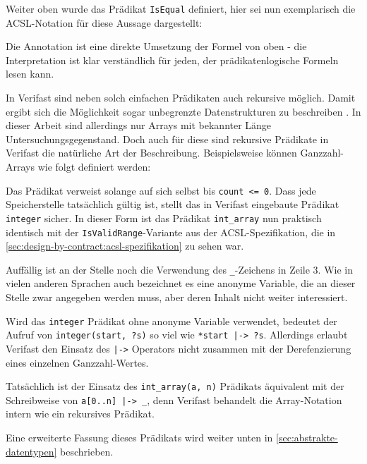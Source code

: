 Weiter oben wurde das Prädikat \lstinline{IsEqual} definiert, hier sei nun exemplarisch die ACSL-Notation
für diese Aussage dargestellt:



Die Annotation ist eine direkte Umsetzung der Formel von oben - die Interpretation ist klar verständlich für 
jeden, der prädikatenlogische Formeln lesen kann.

In Verifast sind neben solch einfachen Prädikaten auch rekursive möglich. Damit ergibt sich die Möglichkeit
sogar unbegrenzte Datenstrukturen zu beschreiben . In dieser
Arbeit sind allerdings nur Arrays mit bekannter Länge Untersuchungsgegenstand. Doch auch für diese sind
rekursive Prädikate in Verifast die natürliche Art der Beschreibung. Beispielsweise können Ganzzahl-Arrays
wie folgt definiert werden:


 
Das Prädikat verweist solange auf sich selbst bis \lstinline{count <= 0}. Dass jede Speicherstelle tatsächlich
gültig ist, stellt das in Verifast eingebaute Prädikat \lstinline{integer} sicher. In dieser Form ist das Prädikat
\lstinline{int_array} nun praktisch identisch mit der \lstinline{IsValidRange}-Variante aus der ACSL-Spezifikation, 
die in \ref{sec:design-by-contract:acsl-spezifikation} zu sehen war.

Auffällig ist an der Stelle noch die Verwendung des \lstinline{_}-Zeichens in Zeile 3. Wie in vielen anderen 
Sprachen auch bezeichnet es eine anonyme Variable, die an dieser Stelle zwar angegeben werden muss, aber deren 
Inhalt nicht weiter interessiert. 

Wird das \lstinline{integer} Prädikat ohne anonyme Variable verwendet, bedeutet der Aufruf von 
\lstinline{integer(start, ?s)} so viel wie \lstinline{*start |-> ?s}. Allerdings erlaubt Verifast
den Einsatz des \lstinline{|->} Operators nicht zusammen mit der Derefenzierung eines einzelnen
Ganzzahl-Wertes.

Tatsächlich ist der Einsatz des \lstinline{int_array(a, n)} Prädikats äquivalent mit der Schreibweise 
von \lstinline{a[0..n] |-> _}, denn Verifast behandelt die Array-Notation intern wie ein rekursives
Prädikat.

Eine erweiterte Fassung dieses Prädikats wird weiter unten in 
\ref{sec:abstrakte-datentypen} beschrieben.



